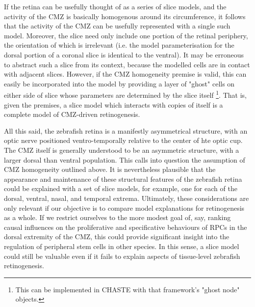 If the retina can be usefully thought of as a series of slice models, and the activity of the CMZ is basically homogenous around its circumference, it follows that the activity of the CMZ can be usefully represented with a single such model. Moreover, the slice need only include one portion of the retinal periphery, the orientation of which is irrelevant (i.e. the model parameterisation for the dorsal portion of a coronal slice is identical to the ventral). It may be erroneous to abstract such a slice from its context, because the modelled cells are in contact with adjacent slices. However, if the CMZ homogeneity premise is valid, this can easily be incorporated into the model by providing a layer of "ghost" cells on either side of slice whose parameters are determined by the slice itself \footnote{This can be implemented in CHASTE with that framework's "ghost node" objects.}. That is, given the premises, a slice model which interacts with copies of itself is a complete model of CMZ-driven retinogenesis.

All this said, the zebrafish retina is a manifestly asymmetrical structure, with an optic nerve positioned ventro-temporally relative to the center of hte optic cup. The CMZ itself is generally understood to be an asymmetric structure, with a larger dorsal than ventral population. This calls into question the assumption of CMZ homogeneity outlined above. It is nevertheless plausible that the appearance and maintenance of these structural features of the zebrafish retina could be explained with a set of slice models, for example, one for each of the dorsal, ventral, nasal, and temporal extrema. Ultimately, these considerations are only relevant if our objective is to compare model explanations for retinogenesis as a whole. If we restrict ourselves to the more modest goal of, say, ranking causal influences on the proliferative and specificative behaviours of RPCs in the dorsal extremity of the CMZ, this could provide significant insight into the regulation of peripheral stem cells in other species. In this sense, a slice model could still be valuable even if it fails to explain aspects of tissue-level zebrafish retinogenesis.

